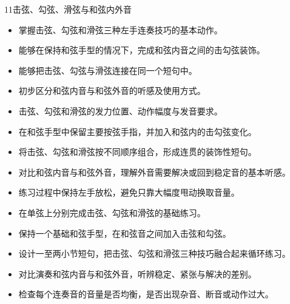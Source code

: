 \begin{lessoncard}{11}{击弦、勾弦、滑弦与和弦内外音}
\begin{itemize}
\item 掌握击弦、勾弦和滑弦三种左手连奏技巧的基本动作。
\item 能够在保持和弦手型的情况下，完成和弦内音之间的击勾弦装饰。
\item 能够把击弦、勾弦与滑弦连接在同一个短句中。
\item 初步区分和弦内音与和弦外音的听感及使用方式。
\end{itemize}
\begin{itemize}
\item 击弦、勾弦和滑弦的发力位置、动作幅度与发音要求。
\item 在和弦手型中保留主要按弦手指，并加入和弦内的击勾弦变化。
\item 将击弦、勾弦和滑弦按不同顺序组合，形成连贯的装饰性短句。
\item 对比和弦内音与和弦外音，理解外音需要解决或回到稳定音的基本听感。
\item 练习过程中保持左手放松，避免只靠大幅度甩动换取音量。
\end{itemize}
\begin{itemize}
\item 在单弦上分别完成击弦、勾弦和滑弦的基础练习。
\item 保持一个基础和弦手型，在和弦音之间加入击弦和勾弦。
\item 设计一至两小节短句，把击弦、勾弦和滑弦三种技巧融合起来循环练习。
\item 对比演奏和弦内音与和弦外音，听辨稳定、紧张与解决的差别。
\item 检查每个连奏音的音量是否均衡，是否出现杂音、断音或动作过大。
\end{itemize}
\begin{fignote}
\begin{center}
\end{center}
\end{fignote}
\end{lessoncard}
